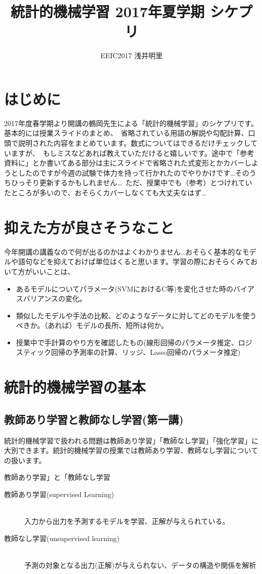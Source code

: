 \documentclass[uplatex]{jsarticle}
\title{統計的機械学習 2017年夏学期 シケプリ}
\author{EEIC2017 浅井明里}
\begin{document}
\maketitle

\section{はじめに}
2017年度春学期より開講の鶴岡先生による「統計的機械学習」のシケプリです。基本的には授業スライドのまとめ、\
省略されている用語の解説や勾配計算、口頭で説明された内容をまとめています。数式についてはできるだけチェックしていますが、\
もしミスなどあれば教えていただけると嬉しいです。途中で「参考資料に」とか書いてある部分は主にスライドで省略された式変形とかカバーしようとしたのですが今週の試験で体力を持って行かれたのでやりかけです…そのうちひっそり更新するかもしれません…\
ただ、授業中でも（参考）とつけれていたところが多いので、おそらくカバーしなくても大丈夫なはず…\

\section{抑えた方が良さそうなこと}
今年開講の講義なので何が出るのかはよくわかりません…おそらく基本的なモデルや語句などを抑えておけば単位はくると思います。学習の際におそらくみておいて方がいいことは、
\begin{itemize}
  \item あるモデルについてパラメータ(SVMにおけるC等)を変化させた時のバイアスバリアンスの変化。
  \item 類似したモデルや手法の比較、どのようなデータに対してどのモデルを使うべきか。（あれば）モデルの長所、短所は何か。
  \item 授業中で手計算のやり方を確認したもの(線形回帰のパラメータ推定、ロジスティック回帰の予測率の計算、リッジ、Lasso回帰のパラメータ推定)
\end{itemize}

\section{統計的機械学習の基本}
\subsection{教師あり学習と教師なし学習(第一講)}
統計的機械学習で扱われる問題は教師あり学習」「教師なし学習」「強化学習」に大別できます。統計的機械学習の授業では教師あり学習、教師なし学習についての扱います。

\begin{itembox}[l]{教師あり学習」と「教師なし学習}
  \begin{description}
    \item [教師あり学習(supervised Learning)]\mbox{}\\
    入力から出力を予測するモデルを学習、正解が与えられている。
    \item [教師なし学習(unsupervised learning)]\mbox{}\\
    予測の対象となる出力(正解)が与えられない、データの構造や関係を解析
  \end{description}
\end{itembox}
\end{document}
